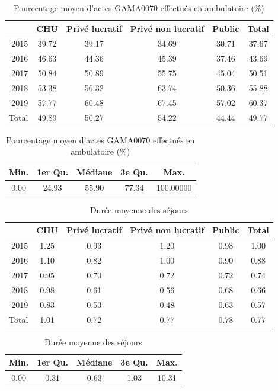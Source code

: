 \begin{table}[!ht]
\centering
\caption{Pourcentage moyen d'actes GAMA0070 effectués en ambulatoire (\%)} 
\label{ambu_GAMA0070}
\begin{tabular}{r|cccc|c}
  \hline
 & CHU & Privé lucratif & Privé non lucratif & Public & Total \\ 
  \hline
2015 & 39.72 & 39.17 & 34.69 & 30.71 & 37.67 \\ 
  2016 & 46.63 & 44.36 & 45.39 & 37.46 & 43.69 \\ 
  2017 & 50.84 & 50.89 & 55.75 & 45.04 & 50.51 \\ 
  2018 & 53.38 & 56.32 & 63.74 & 50.36 & 55.88 \\ 
  2019 & 57.77 & 60.48 & 67.45 & 57.02 & 60.37 \\ 
  \hline
  Total & 49.89 & 50.27 & 54.22 & 44.44 & 49.77 \\ 
   \hline
\end{tabular}
\bigskip

\begin{tabular}{ccccc}
  \hline
Min. & 1er Qu. & Médiane & 3e Qu. & Max. \\ 
  \hline
0.00 & 24.93 & 55.90 & 77.34 & 100.00000  \\ 
   \hline
\end{tabular}
\end{table}

\begin{table}[!ht]
\centering
\caption{Durée moyenne des séjours} 
\label{dms_GAMA0070}
\begin{tabular}{r|cccc|c}
  \hline
 & CHU & Privé lucratif & Privé non lucratif & Public & Total \\ 
  \hline
2015 & 1.25 & 0.93 & 1.20 & 0.98 & 1.00 \\ 
  2016 & 1.10 & 0.82 & 1.00 & 0.90 & 0.88 \\ 
  2017 & 0.95 & 0.70 & 0.72 & 0.72 & 0.74 \\ 
  2018 & 0.98 & 0.61 & 0.56 & 0.68 & 0.66 \\ 
  2019 & 0.83 & 0.53 & 0.48 & 0.63 & 0.57 \\
  \hline
  Total & 1.01 & 0.72 & 0.77 & 0.78 & 0.77 \\ 
   \hline
\end{tabular}

\bigskip

\begin{tabular}{ccccc}
  \hline
Min. & 1er Qu. & Médiane & 3e Qu. & Max. \\ 
  \hline
0.00 & 0.31 & 0.63 & 1.03 & 10.31 \\ 
   \hline
\end{tabular}
\end{table}


